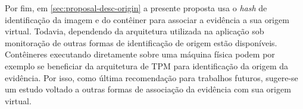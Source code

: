 Por fim, em \ref{sec:proposal-desc-origin} a presente proposta usa o \textit{hash} de identificação da imagem e do contêiner para associar a evidência a sua origem virtual.
%
Todavia, dependendo da arquitetura utilizada na aplicação sob monitoração de \fancyname outras formas de identificação de origem estão disponíveis.
%
Contêineres executando diretamente sobre uma máquina física podem por exemplo se beneficiar da arquitetura de TPM \cite{TPM} para identificação da origem da evidência.
%
Por isso, como última recomendação para trabalhos futuros, sugere-se um estudo voltado a outras formas de associação da evidência com sua origem virtual.
%
